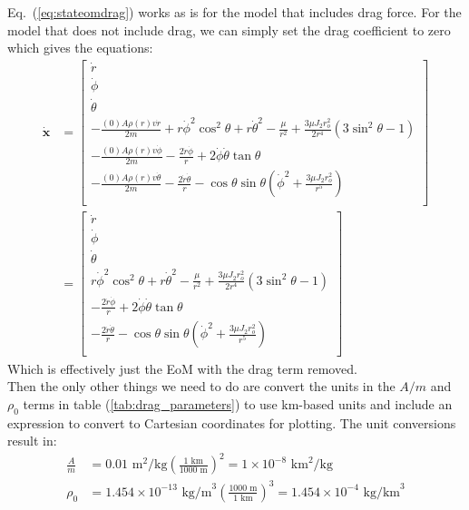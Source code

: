 \documentclass[titlepage]{article}
\begin{document}
Eq.~(\ref{eq:stateomdrag}) works as is for the model that includes drag force. For the model that does not include drag, we can simply set the drag coefficient to zero which gives the equations:
\begin{equation}
	\begin{split}
		\dot{\boldsymbol{x}}&=
		\begin{bmatrix}
			\dot{r} \\
			\dot{\phi} \\
			\dot{\theta} \\
			-\frac{(0)A\rho(r)v\dot{r}}{2m}+r\dot{\phi}^2\cos^2\theta+r\dot{\theta}^2-\frac{\mu}{r^2}+\frac{3\mu J_2r_o^2}{2r^4}\left(3\sin^2\theta-1\right) \\
			-\frac{(0)A\rho(r)v\dot{\phi}}{2m}-\frac{2\dot{r}\dot{\phi}}{r}+2\dot{\phi}\dot{\theta}\tan\theta \\
			-\frac{(0)A\rho(r)v\dot{\theta}}{2m}-\frac{2\dot{r}\dot{\theta}}{r}-\cos\theta\sin\theta\left(\dot{\phi}^2+\frac{3\mu J_2r_o^2}{r^5}\right) \\
		\end{bmatrix} \\
		&=
		\begin{bmatrix}
			\dot{r} \\
			\dot{\phi} \\
			\dot{\theta} \\
			r\dot{\phi}^2\cos^2\theta+r\dot{\theta}^2-\frac{\mu}{r^2}+\frac{3\mu J_2r_o^2}{2r^4}\left(3\sin^2\theta-1\right) \\
			-\frac{2\dot{r}\dot{\phi}}{r}+2\dot{\phi}\dot{\theta}\tan\theta \\
			-\frac{2\dot{r}\dot{\theta}}{r}-\cos\theta\sin\theta\left(\dot{\phi}^2+\frac{3\mu J_2r_o^2}{r^5}\right) \\
		\end{bmatrix}
	\end{split}
\end{equation}
Which is effectively just the EoM with the drag term removed.\\

Then the only other things we need to do are convert the units in the $A/m$ and $\rho_0$ terms in table (\ref{tab:drag_parameters}) to use km-based units and include an expression to convert to Cartesian coordinates for plotting. The unit conversions result in:
\begin{equation}
	\begin{split}
		\frac{A}{m}&=0.01\text{ m}^2\text{/kg}\left(\frac{1\text{ km}}{1000\text{ m}}\right)^2=1\times10^{-8}\text{ km}^2\text{/kg} \\
		\rho_0&=1.454\times10^{-13}\text{ kg/m}^3\left(\frac{1000\text{ m}}{1\text{ km}}\right)^3=1.454\times10^{-4}\text{ kg/km}^3
	\end{split}
\end{equation}
\end{document}
